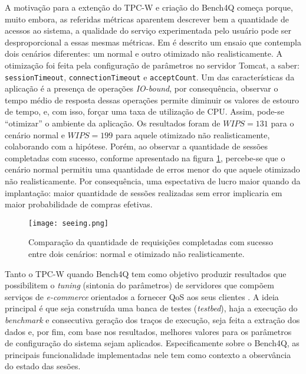 A motivação para a extenção do TPC-W e criação do Bench4Q começa porque, muito embora, as referidas métricas aparentem descrever bem a quantidade de acessos ao sistema, a qualidade do serviço experimentada pelo usuário pode ser desproporcional a essas mesmas métricas. Em \cite{bench4qslides} é descrito um ensaio que contempla dois cenários diferentes: um normal e outro otimizado não realisticamente. A otimização foi feita pela configuração de parâmetros no servidor Tomcat, a saber: \texttt{sessionTimeout}, \texttt{connectionTimeout} e \texttt{acceptCount}. Um das características da aplicação é a presença de operações \textit{ IO-bound}, por consequência, observar o tempo médio de resposta dessas operações permite diminuir os valores de estouro de tempo, e, com isso, forçar uma taxa de utilização de CPU. Assim, pode-se ``otimizar'' o ambiente da aplicação. Os resultados foram de $WIPS = 131$ para o cenário normal e $WIPS=199$ para aquele otimizado não realisticamente, colaborando com a hipótese. Porém, ao observar a quantidade de sessões completadas com sucesso, conforme apresentado na figura \ref{fig:seeing}, percebe-se que o cenário normal permitiu uma quantidade de erros menor do que aquele otimizado não realisticamente. Por consequência, uma espectativa de lucro maior quando da implantação: maior quantidade de sessões realizadas sem error implicaria em maior probabilidade de compras efetivas.

\begin{figure}[htb]
	\caption{Comparação da quantidade de requisições completadas com sucesso entre dois cenários: normal e otimizado não realisticamente.}
	\label{fig:seeing}
	\centering
	\texttt{[image: seeing.png]}
\end{figure}


Tanto o TPC-W quando Bench4Q tem como objetivo produzir resultados que possibilitem o \textit{tuning} (sintonia do parâmetros) de servidores que compõem serviços de \textit{e-commerce} orientados a fornecer QoS aos seus clientes \cite{Menasce2002, Zhang2011}.  A ideia principal é que seja construída uma banca de testes (\textit{testbed}), haja a execução do \textit{ benchmark} e consecutiva geração dos traços de execução, seja feita a extração dos dados e, por fim, com base nos resultados, melhores valores para os parâmetros de configuração do sistema sejam aplicados. Especificamente sobre o Bench4Q, as principais funcionalidade implementadas nele tem como contexto a observância do estado das sesões.

